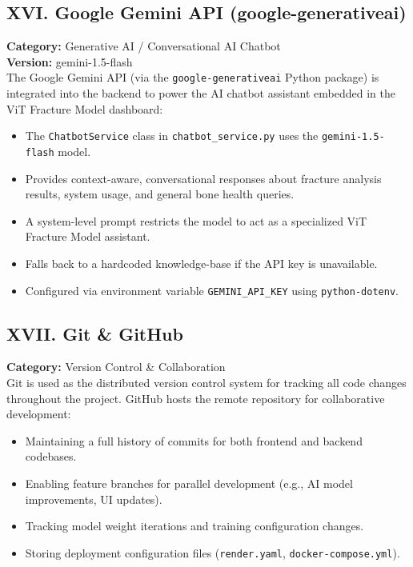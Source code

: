\documentclass[a4paper,12pt]{report}
\begin{document}
    \subsection*{XVI. Google Gemini API (google-generativeai)}
    \textbf{Category:} Generative AI / Conversational AI Chatbot\\
    \textbf{Version:} gemini-1.5-flash\\
    The Google Gemini API (via the \texttt{google-generativeai} Python package) is integrated into the backend to power the AI chatbot assistant embedded in the ViT Fracture Model dashboard:
    \begin{itemize}
        \item The \texttt{ChatbotService} class in \texttt{chatbot\_service.py} uses the \texttt{gemini-1.5-flash} model.
        \item Provides context-aware, conversational responses about fracture analysis results, system usage, and general bone health queries.
        \item A system-level prompt restricts the model to act as a specialized ViT Fracture Model assistant.
        \item Falls back to a hardcoded knowledge-base if the API key is unavailable.
        \item Configured via environment variable \texttt{GEMINI\_API\_KEY} using \texttt{python-dotenv}.
    \end{itemize}

    \subsection*{XVII. Git \& GitHub}
    \textbf{Category:} Version Control \& Collaboration\\
    Git is used as the distributed version control system for tracking all code changes throughout the project. GitHub hosts the remote repository for collaborative development:
    \begin{itemize}
        \item Maintaining a full history of commits for both frontend and backend codebases.
        \item Enabling feature branches for parallel development (e.g., AI model improvements, UI updates).
        \item Tracking model weight iterations and training configuration changes.
        \item Storing deployment configuration files (\texttt{render.yaml}, \texttt{docker-compose.yml}).
    \end{itemize}
\end{document}
